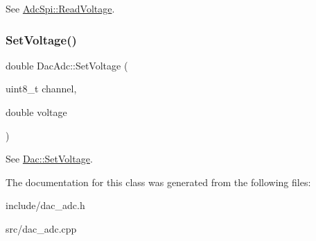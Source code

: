 See \mbox{\hyperlink{classAdcSpi_ace8264acfedb357986afa5f611eff3ee}{Adc\+Spi\+::\+Read\+Voltage}}. \mbox{\label{classDacAdc_a767f1e29f9688c1b2292fbfbef8c4622}} 
\subsubsection{\texorpdfstring{Set\+Voltage()}{SetVoltage()}}
{\footnotesize\ttfamily double Dac\+Adc\+::\+Set\+Voltage (\begin{DoxyParamCaption}\item[{uint8\+\_\+t}]{channel,  }\item[{double}]{voltage }\end{DoxyParamCaption})}

See \mbox{\hyperlink{classDac_ab2f0e36184b9b529de04136c36a3a51b}{Dac\+::\+Set\+Voltage}}. 

The documentation for this class was generated from the following files\+:\begin{DoxyCompactItemize}
\item 
include/dac\+\_\+adc.\+h\item 
src/dac\+\_\+adc.\+cpp\end{DoxyCompactItemize}
